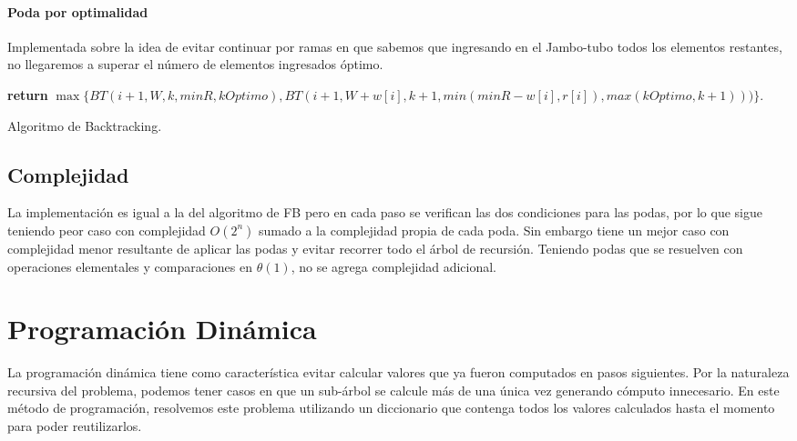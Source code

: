 \documentclass[10pt,a4paper]{article}
\begin{document}
\paragraph{Poda por optimalidad}
Implementada sobre la idea de evitar continuar por ramas en que sabemos que ingresando en el Jambo-tubo todos los elementos restantes, no llegaremos a superar el número de elementos ingresados óptimo.

\begin{algorithm}
	\begin{algorithmic}[1]

		\EndIf
		
		\EndIf
		
		\EndIf
		
		\State \textbf{return} $\max \{ BT(i+1, W, k, minR, kOptimo), BT(i+1, W+w[i], k+1, min(minR - w[i], r[i]), max(kOptimo, k+1))) \}$.
		
		\EndFunction
	\end{algorithmic}
	\caption{Algoritmo de Backtracking.}
	\label{alg:backtracking}
\end{algorithm}

\subsection{Complejidad}
La implementación es igual a la del algoritmo de FB pero en cada paso se verifican las dos condiciones para las podas, por lo que sigue teniendo peor caso con complejidad $O(2^n)$ sumado a la complejidad propia de cada poda. Sin embargo tiene un mejor caso con complejidad menor resultante de aplicar las podas y evitar recorrer todo el árbol de recursión. Teniendo podas que se resuelven con operaciones elementales y comparaciones en $\theta(1)$, no se agrega complejidad adicional.

\section{Programación Dinámica} \label{sec:dp}
La programación dinámica tiene como característica evitar calcular valores que ya fueron computados en pasos siguientes. Por la naturaleza recursiva del problema, podemos tener casos en que un sub-árbol se calcule más de una única vez generando cómputo innecesario. En este método de programación, resolvemos este problema utilizando un diccionario que contenga todos los valores calculados hasta el momento para poder reutilizarlos.
\end{document}
